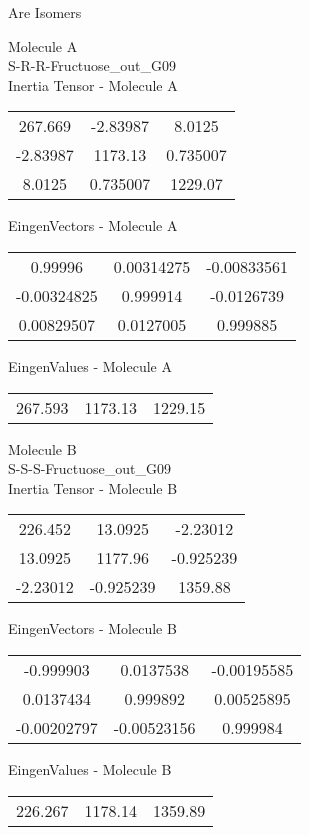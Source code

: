 \begin{center}
\vtab
\vtab
\textcolor{NavyBlue}{\Large Are Isomers}
\end{center}
\newpage
\begin{multicols}{2}
\begin{center}
Molecule A \\ 
S-R-R-Fructuose\_out\_G09
\\
Inertia Tensor - Molecule A \\
\vtab
\begin{tabular}{|c c c|}
267.669	 & 	-2.83987	 & 	8.0125	 \\
-2.83987	 & 	1173.13	 & 	0.735007	 \\
8.0125	 & 	0.735007	 & 	1229.07
\end{tabular}

\vtab
 EingenVectors - Molecule A     \\
\vtab
\begin{tabular}{|c c c|}
0.99996	 & 	0.00314275	 & 	-0.00833561	 \\
-0.00324825	 & 	0.999914	 & 	-0.0126739	 \\
0.00829507	 & 	0.0127005	 & 	0.999885
\end{tabular}

\vtab
 EingenValues - Molecule A     \\
\vtab
\begin{tabular}{|c c c|}
267.593	 & 	1173.13	 & 	1229.15
\end{tabular}
\columnbreak

Molecule B \\ 
S-S-S-Fructuose\_out\_G09
\\
Inertia Tensor - Molecule B \\
\vtab
\begin{tabular}{|c c c|}
226.452	 & 	13.0925	 & 	-2.23012	 \\
13.0925	 & 	1177.96	 & 	-0.925239	 \\
-2.23012	 & 	-0.925239	 & 	1359.88
\end{tabular}

\vtab
 EingenVectors - Molecule B     \\
\vtab
\begin{tabular}{|c c c|}
-0.999903	 & 	0.0137538	 & 	-0.00195585	 \\
0.0137434	 & 	0.999892	 & 	0.00525895	 \\
-0.00202797	 & 	-0.00523156	 & 	0.999984
\end{tabular}

\vtab
 EingenValues - Molecule B     \\
\vtab
\begin{tabular}{|c c c|}
226.267	 & 	1178.14	 & 	1359.89
\end{tabular}

\end{center}
\end{multicols}
